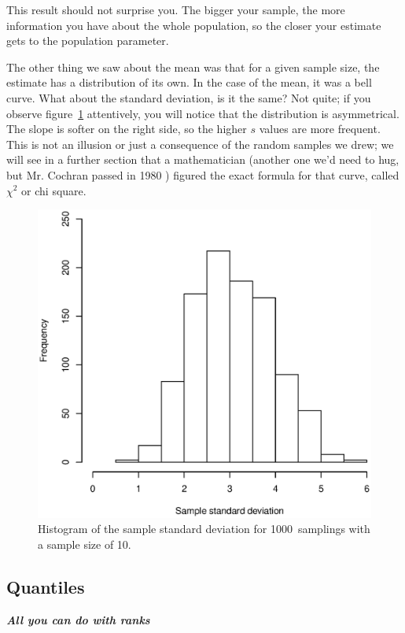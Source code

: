 \documentclass{report}
\newcommand{\notefor}[1]{\hfill\textbf{\textit{#1}}}
\begin{document}
			This result should not surprise you. The bigger your sample, the more information you have about the whole population, so the closer your estimate gets to the population parameter.
			
			The other thing we saw about the mean was that for a given sample size, the estimate has a distribution of its own. In the case of the mean, it was a bell curve. What about the standard deviation, is it the same? Not quite; if you observe figure~\ref{fig:sd_distr} attentively, you will notice that the distribution is asymmetrical. The slope is softer on the right side, so the higher $s$ values are more frequent. This is not an illusion or just a consequence of the random samples we drew; we will see in a further section that a mathematician (another one we'd need to hug, but Mr. Cochran passed in 1980 \cite{cochran}) figured the exact formula for that curve, called $\chi^2$ or chi square.
			
			\begin{figure}[h]
				\centering
				\includegraphics[width=1.0\textwidth]{sd_distr.eps}
				\caption{Histogram of the sample standard deviation for 1000~samplings with a sample size of 10.}
				\label{fig:sd_distr}
			\end{figure}
		
		\subsection{Quantiles}
		\notefor{All you can do with ranks}
		
\end{document}
